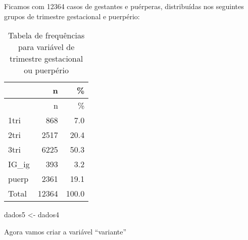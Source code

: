\documentclass[
]{article}
\newenvironment{Shaded}{\begin{snugshade}}{\end{snugshade}}
\newcommand{\AttributeTok}[1]{\textcolor[rgb]{0.77,0.63,0.00}{#1}}
\newcommand{\CommentTok}[1]{\textcolor[rgb]{0.56,0.35,0.01}{\textit{#1}}}
\newcommand{\ConstantTok}[1]{\textcolor[rgb]{0.00,0.00,0.00}{#1}}
\newcommand{\DecValTok}[1]{\textcolor[rgb]{0.00,0.00,0.81}{#1}}
\newcommand{\FunctionTok}[1]{\textcolor[rgb]{0.00,0.00,0.00}{#1}}
\newcommand{\NormalTok}[1]{#1}
\newcommand{\OtherTok}[1]{\textcolor[rgb]{0.56,0.35,0.01}{#1}}
\newcommand{\SpecialCharTok}[1]{\textcolor[rgb]{0.00,0.00,0.00}{#1}}
\newcommand{\StringTok}[1]{\textcolor[rgb]{0.31,0.60,0.02}{#1}}
\begin{document}
Ficamos com 12364 casos de gestantes e puérperas, distribuídas nos
seguintes grupos de trimestre gestacional e puerpério:

\begin{Shaded}
\end{Shaded}

\begin{longtable}[]{@{}lrr@{}}
\caption{Tabela de frequências para variável de trimestre gestacional ou
puerpério}\tabularnewline
\toprule
& n & \% \\
\midrule
\endfirsthead
\toprule
& n & \% \\
\midrule
\endhead
1tri & 868 & 7.0 \\
2tri & 2517 & 20.4 \\
3tri & 6225 & 50.3 \\
IG\_ig & 393 & 3.2 \\
puerp & 2361 & 19.1 \\
Total & 12364 & 100.0 \\
\bottomrule
\end{longtable}

\begin{Shaded}
\begin{Highlighting}[]
\NormalTok{dados5 }\OtherTok{\textless{}{-}}\NormalTok{ dados4}
\end{Highlighting}
\end{Shaded}

Agora vamos criar a variável ``variante''
\end{document}
